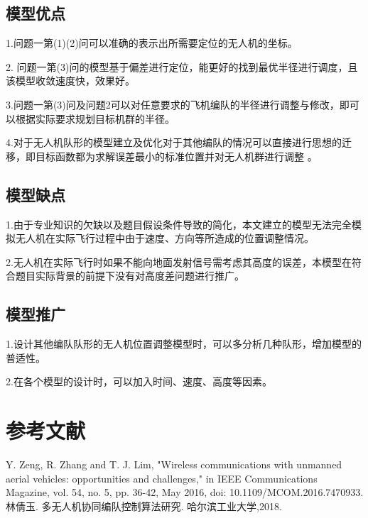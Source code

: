 \documentclass{cumcmthesis}
\begin{document}
\subsection{模型优点}
1.问题一第(1)(2)问可以准确的表示出所需要定位的无人机的坐标。

2. 问题一第(3)问的模型基于偏差进行定位，能更好的找到最优半径进行调度，且该模型收敛速度快，效果好。

3.问题一第(3)问及问题2可以对任意要求的飞机编队的半径进行调整与修改，即可以根据实际要求规划目标机群的半径。

4.对于无人机队形的模型建立及优化对于其他编队的情况可以直接进行思想的迁移，即目标函数都为求解误差最小的标准位置并对无人机群进行调整 。

\subsection{模型缺点}
1.由于专业知识的欠缺以及题目假设条件导致的简化，本文建立的模型无法完全模拟无人机在实际飞行过程中由于速度、方向等所造成的位置调整情况。

2.无人机在实际飞行时如果不能向地面发射信号需考虑其高度的误差，本模型在符合题目实际背景的前提下没有对高度差问题进行推广。

\subsection{模型推广}
1.设计其他编队队形的无人机位置调整模型时，可以多分析几种队形，增加模型的普适性。

2.在各个模型的设计时，可以加入时间、速度、高度等因素。
\section{参考文献}
\begin{thebibliography}{9}%
	Y. Zeng, R. Zhang and T. J. Lim,
	\newblock "Wireless communications with unmanned aerial vehicles: opportunities and challenges," in IEEE Communications Magazine,
	\newblock vol. 54, no. 5, pp. 36-42, May 2016, doi: 10.1109/MCOM.2016.7470933.
	林倩玉.
	\newblock 多无人机协同编队控制算法研究\allowbreak[D].
	\newblock 哈尔滨工业大学,2018.


\end{thebibliography}
\end{document}
